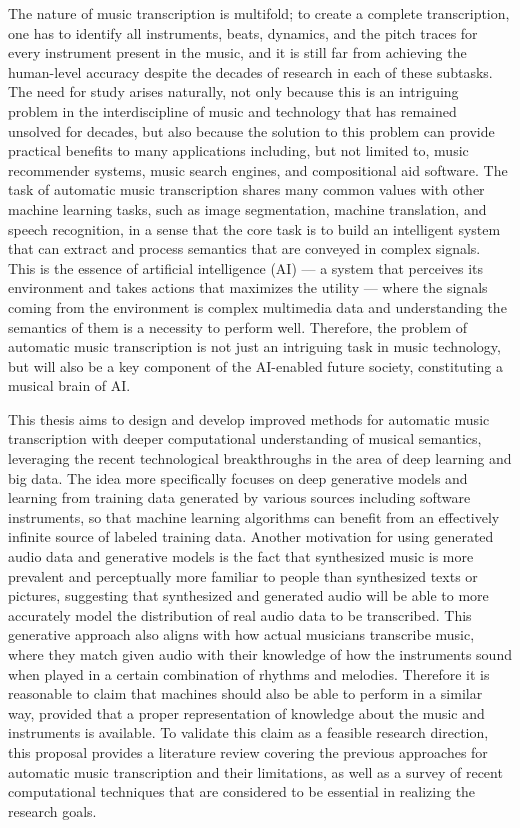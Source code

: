 The nature of music transcription is multifold; to create a complete transcription, one has to identify all instruments, beats, dynamics, and the pitch traces for every instrument present in the music, and it is still far from achieving the human-level accuracy despite the decades of research in each of these subtasks.
The need for study arises naturally, not only because this is an intriguing problem in the interdiscipline of music and technology that has remained unsolved for decades, but also because the solution to this problem can provide practical benefits to many applications including, but not limited to, music recommender systems, music search engines, and compositional aid software.
The task of automatic music transcription shares many common values with other machine learning tasks, such as image segmentation, machine translation, and speech recognition, in a sense that the core task is to build an intelligent system that can extract and process semantics that are conveyed in complex signals.
This is the essence of artificial intelligence (AI)
--- a system that perceives its environment and takes actions that maximizes the utility \cite{russell2009ai} --- 
where the signals coming from the environment is complex multimedia data and understanding the semantics of them is a necessity to perform well.
Therefore, the problem of automatic music transcription is not just an intriguing task in music technology, but will also be a key component of the AI-enabled future society, constituting a musical brain of AI.


This thesis aims to design and develop improved methods for automatic music transcription with deeper computational understanding of musical semantics, leveraging the recent technological breakthroughs in the area of deep learning and big data.
The idea more specifically focuses on deep generative models and learning from training data generated by various sources including software instruments, so that machine learning algorithms can benefit from an effectively infinite source of labeled training data.
Another motivation for using generated audio data and generative models is the fact that synthesized music is more prevalent and perceptually more familiar to people than synthesized texts or pictures, suggesting that synthesized and generated audio will be able to more accurately model the distribution of real audio data to be transcribed.
This generative approach also aligns with how actual musicians transcribe music, where they match given audio with their knowledge of how the instruments sound when played in a certain combination of rhythms and melodies.
Therefore it is reasonable to claim that machines should also be able to perform in a similar way, provided that a proper representation of knowledge about the music and instruments is available.
To validate this claim as a feasible research direction, this proposal provides a literature review covering the previous approaches for automatic music transcription and their limitations, as well as a survey of recent computational techniques that are considered to be essential in realizing the research goals.



